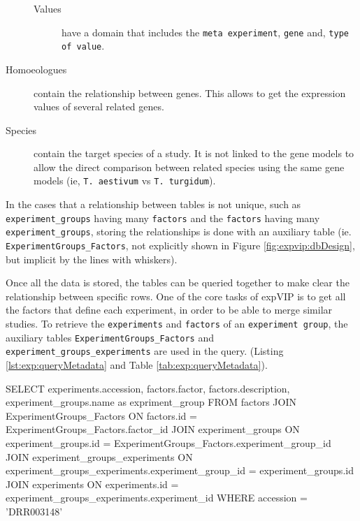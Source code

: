 \begin{description}
\begin{description}
\item[Values] have a domain that includes the \texttt{meta experiment}, \texttt{gene} and, \texttt{type of value}.
\end{description}
\item[Homoeologues] contain the relationship between genes. This allows to get the expression values of several related genes. 
\item[Species] contain the target species of a study. It is not linked to the gene models to allow the direct comparison between related species using the same gene models (ie, \texttt{T. aestivum} vs \texttt{T. turgidum}). 
\end{description}

In the cases that a relationship between tables is not unique, such as \texttt{experiment\_groups} having many \texttt{factors} and the \texttt{factors} having many \texttt{experiment\_groups}, storing the relationships is done with an auxiliary table (ie. \texttt{ExperimentGroups\_Factors}, not explicitly shown in Figure \ref{fig:expvip:dbDesign}, but implicit by the lines with whiskers). 

Once all the data is stored, the tables can be queried together to make clear the relationship between specific rows. 
One of the core tasks of expVIP is to get all the factors that define each experiment, in order to be able to merge similar studies. 
To retrieve the \texttt{experiments} and \texttt{factors} of an \texttt{experiment group}, the auxiliary tables \texttt{ExperimentGroups\_Factors}  and \texttt{experiment\_groups\_experiments} are used in the query. (Listing \ref{lst:exp:queryMetadata} and Table \ref{tab:exp:queryMetadata}).


\begin{code}[language=sql, caption={[Query experiments and factors]Query experiments and factorsQuery experiments and factors from accession 'DRR003148'},label=lst:exp:queryMetadata]
SELECT
	experiments.accession,  
	factors.factor,
	factors.description, 
	experiment_groups.name as expriment_group 
FROM factors 
JOIN ExperimentGroups_Factors 
	ON factors.id = ExperimentGroups_Factors.factor_id
JOIN experiment_groups 
	ON experiment_groups.id = ExperimentGroups_Factors.experiment_group_id
JOIN experiment_groups_experiments 
	ON experiment_groups_experiments.experiment_group_id = experiment_groups.id
JOIN experiments 
	ON experiments.id = experiment_groups_experiments.experiment_id
WHERE accession =  'DRR003148'
\end{code}

